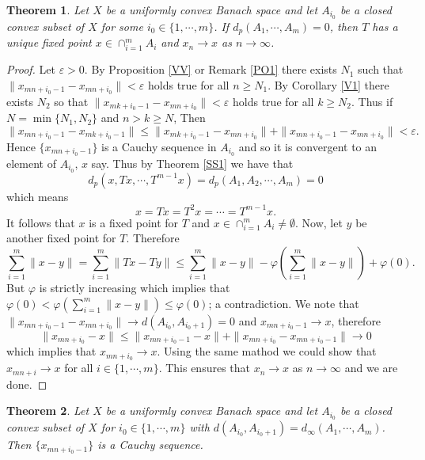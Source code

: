 \documentclass{amsart}
\newtheorem{theorem}{Theorem}[section]
\theoremstyle{definition}
\theoremstyle{remark}
\begin{document}
\begin{theorem}\label{FP1}
Let $X$ be a uniformly convex Banach space and let $A_{i_0}$ be a closed convex subset of $X$ for some $i_0\in\{1,\cdots,m\}$. If $d_p(A_1,\cdots,A_m)=0$, then $T$ has a unique fixed point $x\in\cap_{i=1}^mA_i$ and $x_n\to x$ as $n\to\infty$.
\end{theorem}
\begin{proof}Let $\varepsilon>0$. By Proposition \ref{VV} or Remark \ref{PO1} there exists $N_1$ such that
$\|x_{mn+i_0-1}-x_{mn+i_0}\|<\varepsilon$ holds  true for all $n\geq N_1$. By Corollary \ref{V1} there exists $N_2$ so that $\|x_{mk+i_0-1}-x_{mn+i_0}\|<\varepsilon$  holds  true for all $k\geq N_2$. Thus if $N=\min\{N_1,N_2\}$ and $n>k\geq N$, Then
$$\|x_{mn+i_0-1}-x_{mk+i_0-1}\|\leq\|x_{mk+i_0-1}-x_{mn+i_0}\|+\|x_{mn+i_0-1}-x_{mn+i_0}\|<\varepsilon.$$Hence $\{x_{mn+i_0-1}\}$ is a Cauchy sequence in $A_{i_0}$ and so it is convergent to an element of $A_{i_0}$, $x$ say. Thus
by Theorem \ref{SS1} we have that $$d_p(x,Tx,\cdots,T^{m-1}x)=d_p(A_1,A_2,\cdots,A_m)=0$$ which means $$x=Tx=T^2x=\cdots=T^{m-1}x.$$
It follows that $x$ is a fixed point for $T$ and $x\in\cap_{i=1}^mA_i\neq\emptyset$. Now, let $y$ be another fixed point for $T$. Therefore $$\sum_{i=1}^m\|x-y\|=\sum_{i=1}^m\|Tx-Ty\|\leq\sum_{i=1}^m\|x-y\|-\varphi(\sum_{i=1}^m\|x-y\|)+\varphi(0).$$ But $\varphi$ is strictly increasing which implies that $\varphi(0)<\varphi(\sum_{i=1}^m\|x-y\|)\leq\varphi(0)$; a contradiction. We note that $\|x_{mn+i_0-1}-x_{mn+i_0}\|\to d(A_{i_0},A_{i_0+1})=0$ and $x_{mn+i_0-1}\to x$, therefore $$\|x_{mn+i_0}-x\|\leq\|x_{mn+i_0-1}-x\|+\|x_{mn+i_0}-x_{mn+i_0-1}\|\to0$$ which implies that $x_{mn+i_0}\to x$. Using the same mathod we could show that $x_{mn+i}\to x$ for all $i\in\{1,\cdots,m\}$. This ensures that $x_n\to x$ as $n\to\infty$ and we are done.
\end{proof}
\begin{theorem}\label{FP7}
Let $X$ be a uniformly convex Banach space and let $A_{i_0}$ be a closed convex subset of $X$ for $i_0\in\{1,\cdots,m\}$ with $d(A_{i_0},A_{i_0+1})=d_\infty(A_1,\cdots,A_m)$. Then $\{x_{mn+i_0-1}\}$ is a Cauchy sequence.
\end{theorem}
\end{document}
